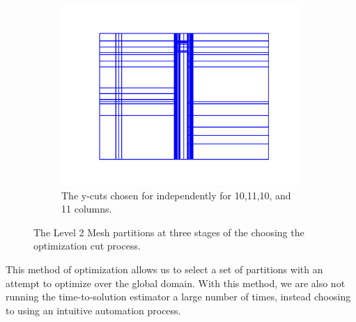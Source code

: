 \begin{figure}[h]
\begin{subfigure}[b]{\textwidth}
    \centering
\includegraphics[scale=0.5]{../../figures/lvl2_suite_2.pdf}
    \caption{The y-cuts chosen for independently for 10,11,10, and 11 columns.} 
    \label{10}
  \end{subfigure}
  \caption{The Level 2 Mesh partitions at three stages of the choosing the optimization cut process.}
  \label{opt_walkthrough}
\end{figure}

This method of optimization allows us to select a set of partitions with an attempt to optimize over the global domain. 
With this method, we are also not running the time-to-solution estimator a large number of times, instead choosing to using an intuitive automation process.

\FloatBarrier

